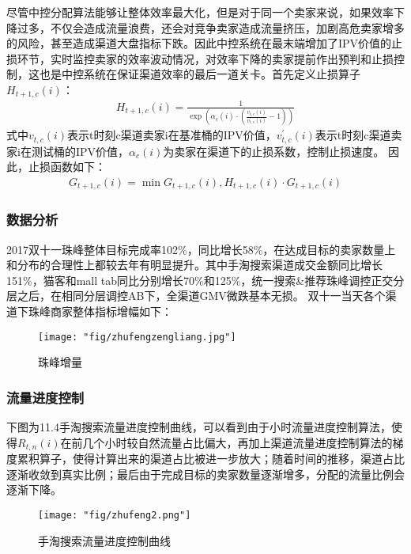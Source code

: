 尽管中控分配算法能够让整体效率最大化，但是对于同一个卖家来说，如果效率下降过多，不仅会造成流量浪费，还会对竞争卖家造成流量挤压，加剧高危卖家增多的风险，甚至造成渠道大盘指标下跌。因此中控系统在最末端增加了IPV价值的止损环节，实时监控卖家的效率波动情况，对效率下降的卖家提前作出预判和止损控制，这也是中控系统在保证渠道效率的最后一道关卡。首先定义止损算子$H_{t+1,c}(i)$：
\begin{align}
H_{t+1,c}(i) = \frac{1}{\exp\left(\alpha_c(i) \cdot (\frac{v_{t,c}(i)}{v_{t,c}^{'}(i)} - 1)\right )}
\end{align}
式中$v_{t,c}(i)$表示t时刻c渠道卖家i在基准桶的IPV价值，$v_{t,c}^{'}(i)$表示t时刻c渠道卖家i在测试桶的IPV价值，$\alpha_c(i)$为卖家在渠道下的止损系数，控制止损速度。
因此，止损函数如下：
\begin{align}
G_{t+1,c}(i)= \min{ G_{t+1,c}(i), H_{t+1,c}(i) \cdot G_{t+1,c}(i) }
\end{align}

\subsubsection{数据分析}
2017双十一珠峰整体目标完成率102\%，同比增长58\%，在达成目标的卖家数量上和分布的合理性上都较去年有明显提升。其中手淘搜索渠道成交金额同比增长151\%，猫客和mall tab同比分别增长70\%和125\%，统一搜索\&推荐珠峰调控正交分层之后，在相同分层调控AB下，全渠道GMV微跌基本无损。
双十一当天各个渠道下珠峰商家整体指标增幅如下：

\begin{figure}[!h]
	\centering
	\texttt{[image: "fig/zhufengzengliang.jpg"]}
	\caption{珠峰增量}
	\label{fig:zhufengzengliang}
\end{figure}

\subsubsection{流量进度控制}
下图为11.4手淘搜索流量进度控制曲线，可以看到由于小时流量进度控制算法，使得$R_{t,n}(i)$在前几个小时较自然流量占比偏大，再加上渠道流量进度控制算法的梯度累积算子，使得计算出来的渠道占比被进一步放大；随着时间的推移，渠道占比逐渐收敛到真实比例；最后由于完成目标的卖家数量逐渐增多，分配的流量比例会逐渐下降。

\begin{figure}[!h]
	\centering
	\texttt{[image: "fig/zhufeng2.png"]}
	\caption{手淘搜索流量进度控制曲线}
	\label{fig:zhufeng2}
\end{figure}

